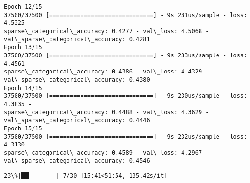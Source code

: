 \documentclass[11pt]{article}
\begin{document}
\begin{Verbatim}[commandchars=\\\{\}]
Epoch 12/15
37500/37500 [==============================] - 9s 231us/sample - loss: 4.5325 -
sparse\_categorical\_accuracy: 0.4277 - val\_loss: 4.5068 -
val\_sparse\_categorical\_accuracy: 0.4281
Epoch 13/15
37500/37500 [==============================] - 9s 233us/sample - loss: 4.4561 -
sparse\_categorical\_accuracy: 0.4386 - val\_loss: 4.4329 -
val\_sparse\_categorical\_accuracy: 0.4380
Epoch 14/15
37500/37500 [==============================] - 9s 230us/sample - loss: 4.3835 -
sparse\_categorical\_accuracy: 0.4488 - val\_loss: 4.3629 -
val\_sparse\_categorical\_accuracy: 0.4446
Epoch 15/15
37500/37500 [==============================] - 9s 232us/sample - loss: 4.3130 -
sparse\_categorical\_accuracy: 0.4589 - val\_loss: 4.2967 -
val\_sparse\_categorical\_accuracy: 0.4546
    \end{Verbatim}

    \begin{Verbatim}[commandchars=\\\{\}]
 23\%|██▎       | 7/30 [15:41<51:54, 135.42s/it]
    \end{Verbatim}
\end{document}
